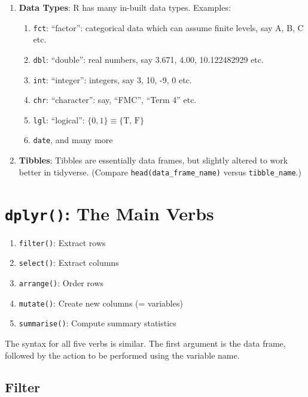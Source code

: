\documentclass[11pt,]{article}
\providecommand{\tightlist}{%
  \setlength{\itemsep}{0pt}\setlength{\parskip}{0pt}}
\begin{document}
\begin{enumerate}
\def\labelenumi{\arabic{enumi}.}
\tightlist
\item
  \textbf{Data Types}: R has many in-built data types. Examples:

  \begin{enumerate}
  \def\labelenumii{\roman{enumii}.}
  \tightlist
  \item
    \texttt{fct}: ``factor'': categorical data which can assume finite
    levels, say A, B, C etc.
  \item
    \texttt{dbl}: ``double'': real numbers, say 3.671, 4.00,
    10.122482929 etc.
  \item
    \texttt{int}: ``integer'': integers, say 3, 10, -9, 0 etc.
  \item
    \texttt{chr}: ``character'': say, ``FMC'', ``Term 4'' etc.
  \item
    \texttt{lgl}: ``logical'': \(\{0, 1\}\equiv \{\text{T, F}\}\)
  \item
    \texttt{date}, and many more
  \end{enumerate}
\item
  \textbf{Tibbles}: Tibbles are essentially data frames, but slightly
  altered to work better in tidyverse. (Compare
  \texttt{head(data\_frame\_name)} versus \texttt{tibble\_name}.)
\end{enumerate}

\section{\texorpdfstring{\texttt{dplyr()}: The Main
Verbs}{dplyr(): The Main Verbs}}\label{dplyr-the-main-verbs}

\begin{enumerate}
\def\labelenumi{\arabic{enumi}.}
\tightlist
\item
  \texttt{filter()}: Extract rows
\item
  \texttt{select()}: Extract columns
\item
  \texttt{arrange()}: Order rows
\item
  \texttt{mutate()}: Create new columns (= variables)
\item
  \texttt{summarise()}: Compute summary statistics
\end{enumerate}

The syntax for all five verbs is similar. The first argument is the data
frame, followed by the action to be performed using the variable name.

\subsection{Filter}\label{filter}
\end{document}
